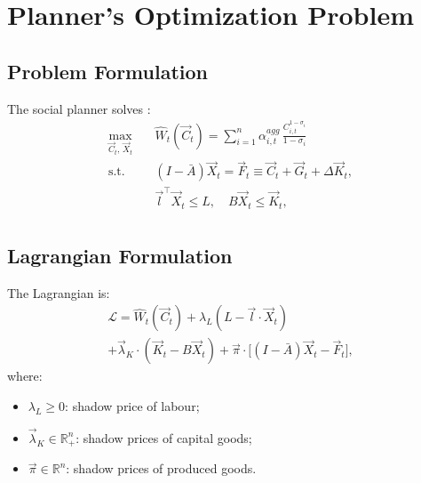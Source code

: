 \section{Planner's Optimization Problem}
\label{sec:optimization}

\subsection{Problem Formulation}

The social planner solves \citep{kantorovich1965best,dantzig1963linear}:
%
\begin{equation}\label{eq:planning_problem}
\begin{aligned}
    \max_{\vec{C}_t,\,\vec{X}_t} \quad
        & \hat{W}_t(\vec{C}_t) = \sum_{i=1}^n \alpha^{agg}_{i,t}
          \,\frac{C_{i,t}^{1-\sigma_i}}{1-\sigma_i} \\
    \text{s.t.}\quad
        & (I - \bar{A})\vec{X}_t = \vec{F}_{t}
          \equiv \vec{C}_t + \vec{G}_{t}+ \Delta\vec{K}_{t}, \\
        & \vec{l}^{\top} \vec{X}_t \leq L,
     \quad B\vec{X}_t \leq \vec{K}_t, \\
\end{aligned}
\end{equation}

\subsection{Lagrangian Formulation}

The Lagrangian is:
%
\begin{equation}\label{eq:lagrangian}
\begin{aligned}
    \mathcal{L} = \hat{W}_t(\vec{C}_t)
        + \lambda_{L} (L - \vec{l} \cdot \vec{X}_t)
        \\+ \vec{\lambda}_{K} \cdot (\vec{K}_t - B\vec{X}_t)
     + \vec{\pi} \cdot
          \bigl[(I - \bar{A})\vec{X}_t - \vec{F}_{t}\bigr],
\end{aligned}
\end{equation}
%
where:
\begin{itemize}
    \item $\lambda_L \geq 0$: shadow price of labour;
    \item $\vec{\lambda}_K \in \mathbb{R}^n_+$: shadow prices of capital
          goods;
    \item $\vec{\pi} \in \mathbb{R}^n$: shadow prices of produced
          goods.
\end{itemize}

